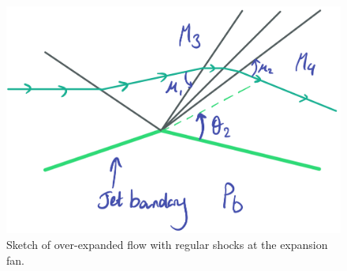 \documentclass[11pt]{article}
\numberwithin{equation}{section}
\begin{document}
\begin{figure}[H]
    \centering
    \includegraphics[width = 0.4\paperheight]{./img/overexpanded3.png}
    \caption{Sketch of over-expanded flow with regular shocks at the expansion fan.}
\end{figure}
\end{document}
